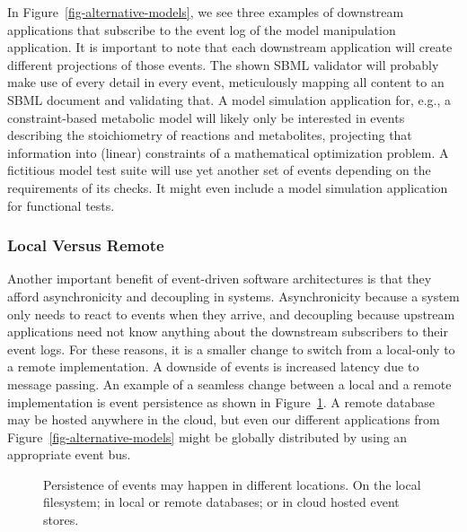 \documentclass[
  a4paper,
]{scrartcl}
\makeatletter
\newcommand*\pandocbounded[1]{%
  \sbox\pandoc@box{#1}%
  \Gscale@div\@tempa{\textheight}{\dimexpr\ht\pandoc@box+\dp\pandoc@box\relax}%
  \Gscale@div\@tempb{\linewidth}{\wd\pandoc@box}%
  \ifdim\@tempb\p@<\@tempa\p@\let\@tempa\@tempb\fi%
  \ifdim\@tempa\p@<\p@\scalebox{\@tempa}{\usebox\pandoc@box}%
  \else\usebox{\pandoc@box}%
  \fi%
}
\makeatother
\begin{document}
In Figure~\ref{fig-alternative-models}, we see three examples of
downstream applications that subscribe to the event log of the model
manipulation application. It is important to note that each downstream
application will create different projections of those events. The shown
SBML validator will probably make use of every detail in every event,
meticulously mapping all content to an SBML document and validating
that. A model simulation application for, e.g., a constraint-based
metabolic model will likely only be interested in events describing the
stoichiometry of reactions and metabolites, projecting that information
into (linear) constraints of a mathematical optimization problem. A
fictitious model test suite will use yet another set of events depending
on the requirements of its checks. It might even include a model
simulation application for functional tests.

\subsubsection{Local Versus Remote}\label{local-versus-remote}

Another important benefit of event-driven software architectures is that
they afford asynchronicity and decoupling in systems. Asynchronicity
because a system only needs to react to events when they arrive, and
decoupling because upstream applications need not know anything about
the downstream subscribers to their event logs. For these reasons, it is
a smaller change to switch from a local-only to a remote implementation.
A downside of events is increased latency due to message passing. An
example of a seamless change between a local and a remote implementation
is event persistence as shown in Figure~\ref{fig-event-log-persistence}.
A remote database may be hosted anywhere in the cloud, but even our
different applications from Figure~\ref{fig-alternative-models} might be
globally distributed by using an appropriate event bus.

\begin{figure}

\centering{

\pandocbounded{\texttt{[image: event-log-persistence.pdf]}}

}

\caption{\label{fig-event-log-persistence}Persistence of events may
happen in different locations. On the local filesystem; in local or
remote databases; or in cloud hosted event stores.}

\end{figure}%
\end{document}
